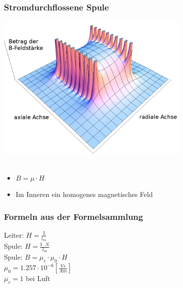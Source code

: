 \begin{frame}
    \frametitle{Stromdurchflossene Spule}
    \begin{center}
		\includegraphics[width=0.7\textwidth]{a08/3-D_HFeld.png}\\
		\tiny \hyperlink{refs}{\cite{wm}} \\[1em] \large
		\begin{itemize}
		\item $B = \mu \cdot H$
		\item Im Inneren ein homogenes magnetisches Feld
		\end{itemize}
	\end{center}
\end{frame}

\begin{frame}
    \frametitle{Formeln aus der Formelsammlung}
    \begin{center}
        \huge Leiter: $H = \frac{\mathrm{I}}{l_m}$ \\[1em]
    	\huge Spule: $H = \frac{\mathrm{I} \cdot N}{l_m}$ \\[1em]
    	\huge Spule: $B = \mu_r \cdot \mu_0 \cdot H$\\[1em]
    	 $\mu_0 = 1.257 \cdot 10^{-6}[\frac{Vs}{Am}]$ \\[1em]
    	 $\mu_r = 1$ bei Luft
    \end{center}
\end{frame}


